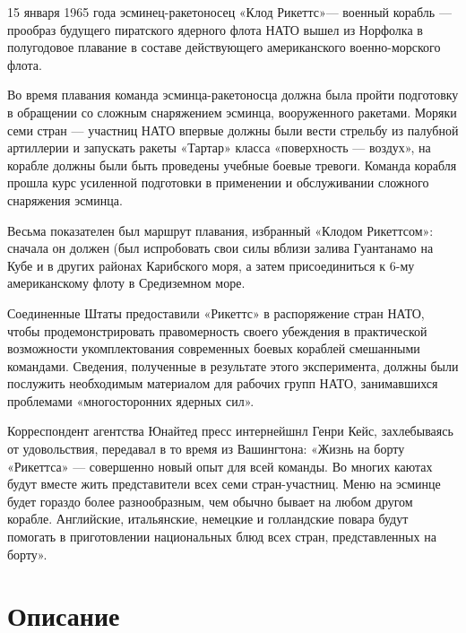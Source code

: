 \documentclass[12pt, a4paper, openany]{book}
\begin{document}
	15 января 1965 года эсминец-ракетоносец «Клод Рикеттс»— военный корабль — прообраз будущего пиратского ядерного флота НАТО вышел из Норфолка в полугодовое плавание в составе действующего американского военно-морского флота.
	
	Во время плавания команда эсминца-ракетоносца должна была пройти подготовку в обращении со сложным снаряжением эсминца, вооруженного ракетами. Моряки семи стран — участниц НАТО впервые должны были вести стрельбу из палубной артиллерии и запускать ракеты «Тартар» класса «поверхность — воздух», на корабле должны были быть проведены учебные боевые тревоги. Команда корабля прошла курс усиленной подготовки в применении и обслуживании сложного снаряжения эсминца.
	
	Весьма показателен был маршрут плавания, избранный «Клодом Рикеттсом»: сначала он должен (был испробовать свои силы вблизи залива Гуантанамо на Кубе и в других районах Карибского моря, а затем присоединиться к 6-му американскому флоту в Средиземном море.
	
	Соединенные Штаты предоставили «Рикеттс» в распоряжение стран НАТО, чтобы продемонстрировать правомерность своего убеждения в практической возможности укомплектования современных боевых кораблей смешанными командами. Сведения, полученные в результате этого эксперимента, должны были послужить необходимым материалом для рабочих групп НАТО, занимавшихся проблемами «многосторонних ядерных сил».
	
	Корреспондент агентства Юнайтед пресс интернейшнл Генри Кейс, захлебываясь от удовольствия, передавал в то время из Вашингтона: «Жизнь на борту «Рикеттса» — совершенно новый опыт для всей команды. Во многих каютах будут вместе жить представители всех семи стран-участниц. Меню на эсминце будет гораздо более разнообразным, чем обычно бывает на любом другом корабле. Английские, итальянские, немецкие и голландские повара будут помогать в приготовлении национальных блюд всех стран, представленных на борту».
	
	
	\newpage
	\tableofcontents
	
	\thispagestyle{empty} %
	
	\newpage
	
	\setcounter{secnumdepth}{0}
	
	
		\section*{Описание}
	
\end{document}

